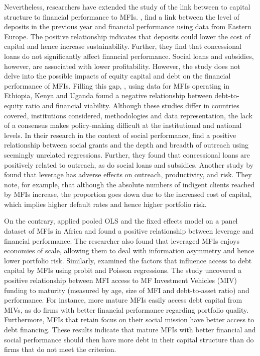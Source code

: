 \documentclass[a4paper, nobind]{templates/ociamthesis}
\begin{document}
Nevertheless, researchers have extended the study of the link between to capital structure to financial performance to MFIs. \textcite{khachatryan2017performance}, find a link between the level of deposits in the previous year and financial performance using data from Eastern Europe. The positive relationship indicates that deposits could lower the cost of capital and hence increase sustainability. Further, they find that concessional loans do not significantly affect financial performance. Social loans and subsidies, however, are associated with lower profitability. However, the study does not delve into the possible impacts of equity capital and debt on the financial performance of MFIs. Filling this gap, \textcite{ayele2015microfinance}, using data for MFIs operating in Ethiopia, Kenya and Uganda found a negative relationship between debt-to-equity ratio and financial viability. Although these studies differ in countries covered, institutions considered, methodologies and data representation, the lack of a consensus makes policy-making difficult at the institutional and national levels.
In their research in the context of social performance, \textcite{khachatryan2017performance} find a positive relationship between social grants and the depth and breadth of outreach using seemingly unrelated regressions. Further, they found that concessional loans are positively related to outreach, as do social loans and subsidies. Another study by \textcite{hoque2011commercialization} found that leverage has adverse effects on outreach, productivity, and risk. They note, for example, that although the absolute numbers of indigent clients reached by MFIs increase, the proportion goes down due to the increased cost of capital, which implies higher default rates and hence higher portfolio risk.

On the contrary, \textcite{kyereboah2007determinants} applied pooled OLS and the fixed effects model on a panel dataset of MFIs in Africa and found a positive relationship between leverage and financial performance. The researcher also found that leveraged MFIs enjoys economies of scale, allowing them to deal with information asymmetry and hence lower portfolio risk. Similarly, \textcite{dorfleitner2017access} examined the factors that influence access to debt capital by MFIs using probit and Poisson regressions. The study uncovered a positive relationship between MFI access to MF Investment Vehicles (MIV) funding to maturity (measured by age, size of MFI and debt-to-asset ratio) and performance. For instance, more mature MFIs easily access debt capital from MIVs, as do firms with better financial performance regarding portfolio quality. Furthermore, MFIs that retain focus on their social mission have better access to debt financing. These results indicate that mature MFIs with better financial and social performance should then have more debt in their capital structure than do firms that do not meet the criterion.
\end{document}
